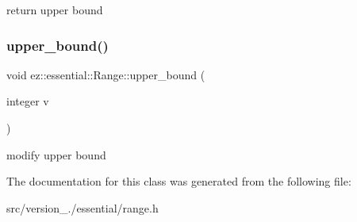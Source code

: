 return upper bound \mbox{\label{classez_1_1essential_1_1Range_ac02c931b80980f50048ca5ad9c0dbcf3}} 
\subsubsection{\texorpdfstring{upper\+\_\+bound()}{upper\_bound()}\hspace{0.1cm}{\footnotesize\ttfamily [2/2]}}
{\footnotesize\ttfamily void ez\+::essential\+::\+Range\+::upper\+\_\+bound (\begin{DoxyParamCaption}\item[{integer}]{v }\end{DoxyParamCaption})\hspace{0.3cm}{\ttfamily [inline]}}

modify upper bound 

The documentation for this class was generated from the following file\+:\begin{DoxyCompactItemize}
\item 
src/version\+\_./essential/range.\+h\end{DoxyCompactItemize}
